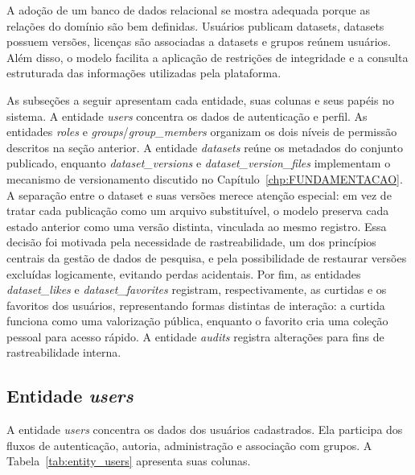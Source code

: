 A adoção de um banco de dados relacional se mostra adequada porque as relações do domínio são bem definidas. Usuários publicam datasets, datasets possuem versões, licenças são associadas a datasets e grupos reúnem usuários. Além disso, o modelo facilita a aplicação de restrições de integridade e a consulta estruturada das informações utilizadas pela plataforma.

As subseções a seguir apresentam cada entidade, suas colunas e seus papéis no sistema. A entidade \textit{users} concentra os dados de autenticação e perfil. As entidades \textit{roles} e \textit{groups}/\textit{group\_members} organizam os dois níveis de permissão descritos na seção anterior. A entidade \textit{datasets} reúne os metadados do conjunto publicado, enquanto \textit{dataset\_versions} e \textit{dataset\_version\_files} implementam o mecanismo de versionamento discutido no Capítulo~\ref{chp:FUNDAMENTACAO}. A separação entre o dataset e suas versões merece atenção especial: em vez de tratar cada publicação como um arquivo substituível, o modelo preserva cada estado anterior como uma versão distinta, vinculada ao mesmo registro. Essa decisão foi motivada pela necessidade de rastreabilidade, um dos princípios centrais da gestão de dados de pesquisa, e pela possibilidade de restaurar versões excluídas logicamente, evitando perdas acidentais. Por fim, as entidades \textit{dataset\_likes} e \textit{dataset\_favorites} registram, respectivamente, as curtidas e os favoritos dos usuários, representando formas distintas de interação: a curtida funciona como uma valorização pública, enquanto o favorito cria uma coleção pessoal para acesso rápido. A entidade \textit{audits} registra alterações para fins de rastreabilidade interna.

\subsection{Entidade \textit{users}}

A entidade \textit{users} concentra os dados dos usuários cadastrados. Ela participa dos fluxos de autenticação, autoria, administração e associação com grupos. A Tabela~\ref{tab:entity_users} apresenta suas colunas.

